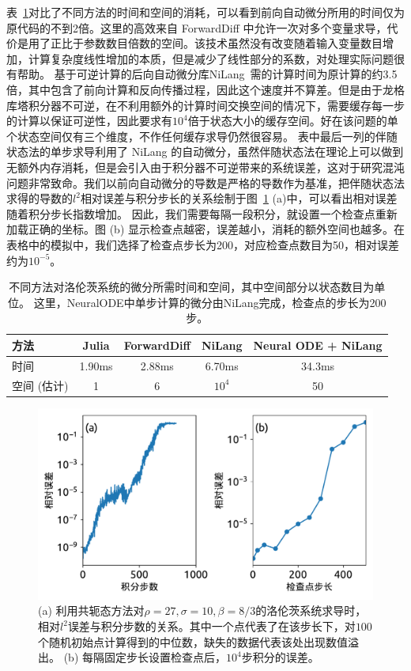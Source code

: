 \documentclass[A4,twoside,UTF8]{ctexart}
\begin{document}
表~\ref{tbl:lorenztiming}对比了不同方法的时间和空间的消耗，可以看到前向自动微分所用的时间仅为原代码的不到2倍。这里的高效来自 ForwardDiff 中允许一次对多个变量求导，代价是用了正比于参数数目倍数的空间。该技术虽然没有改变随着输入变量数目增加，计算复杂度线性增加的本质，但是减少了线性部分的系数，对处理实际问题很有帮助。
基于可逆计算的后向自动微分库NiLang~\cite{Liu2020b}需的计算时间为原计算的约3.5倍，其中包含了前向计算和反向传播过程，因此这个速度并不算差。但是由于龙格库塔积分器不可逆，在不利用额外的计算时间交换空间的情况下，需要缓存每一步的计算以保证可逆性，因此要求有$10^4$倍于状态大小的缓存空间。好在该问题的单个状态空间仅有三个维度，不作任何缓存求导仍然很容易。
表中最后一列的伴随状态法的单步求导利用了 NiLang 的自动微分，虽然伴随状态法在理论上可以做到无额外内存消耗，但是会引入由于积分器不可逆带来的系统误差，这对于研究混沌问题非常致命。我们以前向自动微分的导数是严格的导数作为基准，把伴随状态法求得的导数的$l^2$相对误差与积分步长的关系绘制于图~\ref{fig:neuralode-error} (a)中，可以看出相对误差随着积分步长指数增加。
因此，我们需要每隔一段积分，就设置一个检查点重新加载正确的坐标。图 (b) 显示检查点越密，误差越小，消耗的额外空间也越多。在表格中的模拟中，我们选择了检查点步长为200，对应检查点数目为50，相对误差约为$10^{-5}$。

\begin{table}\centering
    \begin{tabularx}{0.8\textwidth}{Xcccc}\toprule
        方法 & Julia & ForwardDiff & NiLang & Neural ODE + NiLang\\
        \hline
        时间          & 1.90ms   &  2.88ms & 6.70ms & 34.3ms\\  %
        空间 (估计)          & 1   &  6 & $10^4$ & 50\\  %
        \bottomrule
    \end{tabularx}
    \caption{不同方法对洛伦茨系统的微分所需时间和空间，其中空间部分以状态数目为单位。
    这里，NeuralODE中单步计算的微分由NiLang完成，检查点的步长为200步。}\label{tbl:lorenztiming}
\end{table}

\begin{figure}[t]
\centering
\includegraphics[width=0.6\columnwidth]{./fig2.pdf}
    \caption{(a) 利用共轭态方法对$\rho=27, \sigma=10, \beta=8/3$的洛伦茨系统求导时，相对$l^2$误差与积分步数的关系。其中一个点代表了在该步长下，对$100$个随机初始点计算得到的中位数，缺失的数据代表该处出现数值溢出。 (b) 每隔固定步长设置检查点后，$10^4$步积分的误差。\label{fig:neuralode-error}}
\end{figure}
\end{document}
